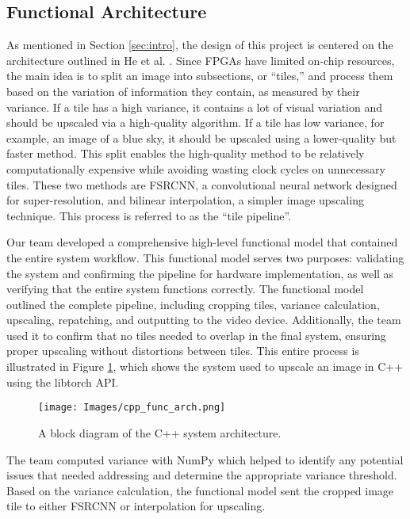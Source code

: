 \documentclass{article}
\begin{document}
    \subsection{Functional Architecture}
        \noindent As mentioned in Section \ref{sec:intro}, the design of this project is centered on the architecture outlined in He et al. \cite{he_fpga_based_2018}. Since FPGAs have limited on-chip resources, the main idea is to split an image into subsections, or “tiles,” and process them based on the variation of information they contain, as measured by their variance. If a tile has a high variance, it contains a lot of visual variation and should be upscaled via a high-quality algorithm. If a tile has low variance, for example, an image of a blue sky, it should be upscaled using a lower-quality but faster method. This split enables the high-quality method to be relatively computationally expensive while avoiding wasting clock cycles on unnecessary tiles. These two methods are FSRCNN, a convolutional neural network designed for super-resolution, and bilinear interpolation, a simpler image upscaling technique. This process is referred to as the “tile pipeline”. 
        \par Our team developed a comprehensive high-level functional model that contained the entire system workflow. This functional model serves two purposes: validating the system and confirming the pipeline for hardware implementation, as well as verifying that the entire system functions correctly. The functional model outlined the complete pipeline, including cropping tiles, variance calculation, upscaling, repatching, and outputting to the video device. Additionally, the team used it to confirm that no tiles needed to overlap in the final system, ensuring proper upscaling without distortions between tiles. This entire process is illustrated in Figure \ref{fig:cpp_sys_arch}, which shows the system used to upscale an image in C++ using the libtorch API. 
            \begin{figure}[!tb] 
                \centering
                \texttt{[image: Images/cpp\_func\_arch.png]} 
                \caption{A block diagram of the C++ system architecture.}
                \label{fig:cpp_sys_arch} 
            \end{figure}
    
        \par The team computed variance with NumPy which helped to identify any potential issues that needed addressing and determine the appropriate variance threshold. Based on the variance calculation, the functional model sent the cropped image tile to either FSRCNN or interpolation for upscaling.
    
\end{document}
